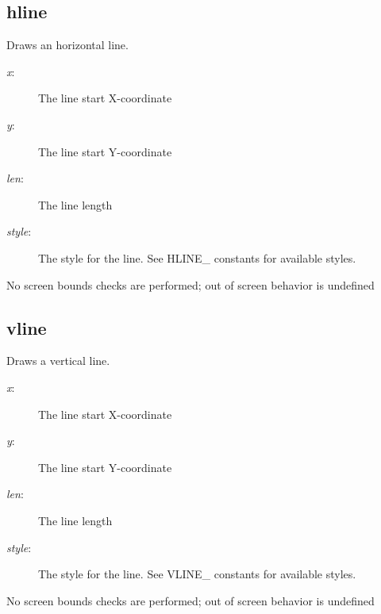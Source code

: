 \subsection{hline}
\begin{description}[leftmargin=2cm,style=nextline]
\item [Description:] {Draws an horizontal line.}
\item [Syntax:] 
\item [Parameters:]
\begin{description}\item[]
\item [{\em x}:] {The line start X-coordinate}
\item [{\em y}:] {The line start Y-coordinate}
\item [{\em len}:] {The line length}
\item [{\em style}:] {The style for the line. See HLINE\_ constants for available styles. }
\end{description}
\item [Notes:] {No screen bounds checks are performed; out of screen behavior is undefined }
\end{description}

\subsection{vline}
\begin{description}[leftmargin=2cm,style=nextline]
\item [Description:] {Draws a vertical line.}
\item [Syntax:] 
\item [Parameters:]
\begin{description}\item[]
\item [{\em x}:] {The line start X-coordinate}
\item [{\em y}:] {The line start Y-coordinate}
\item [{\em len}:] {The line length}
\item [{\em style}:] {The style for the line. See VLINE\_ constants for available styles. }
\end{description}
\item [Notes:] {No screen bounds checks are performed; out of screen behavior is undefined }
\end{description}

